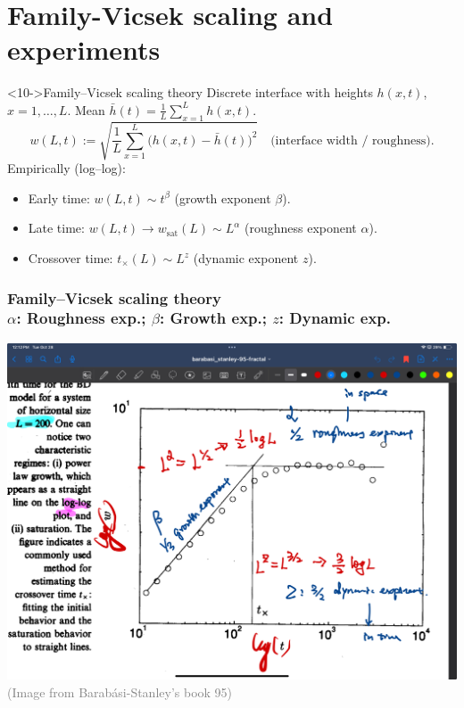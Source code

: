 \documentclass[9pt,table,xcolor=dvipsnames]{beamer}
\begin{document}
\section{Family-Vicsek scaling and experiments}

\begin{frame}<10->{Family--Vicsek scaling theory}
  \small Discrete interface with heights $h(x,t)$, $x=1,\dots,L$. Mean $\bar
  h(t)=\frac1L\sum_{x=1}^L h(x,t)$.
  \[
    w(L,t)
    :=\sqrt{\frac1L\sum_{x=1}^L\big(h(x,t)-\bar h(t)\big)^2}
    \quad\text{(interface width / roughness)}.
  \]
  Empirically (log--log):
  \begin{itemize}\itemsep2pt
    \item Early time: $w(L,t)\sim t^{\beta}$ (growth exponent $\beta$).
    \item Late time: $w(L,t)\to w_{\mathrm{sat}}(L)\sim L^{\alpha}$ (roughness
      exponent $\alpha$).
    \item Crossover time: $t_\times(L)\sim L^{z}$ (dynamic exponent $z$).
   \end{itemize}
  
\end{frame}
\begin{frame}[fragile,t] %
 \frametitle{Family--Vicsek scaling theory \\ 
 \small $\alpha$: Roughness exp.; $\beta$: Growth exp.; $z$: Dynamic exp.}
  \begin{center}
    \includegraphics[width=0.9\linewidth]{./figs/log-log_Illistrutaion.jpg} \\

    \vfill{\footnotesize \textcolor{gray}{(Image from Barab\'asi-Stanley's book
    95)}}
  \end{center}
\end{frame}
\end{document}
